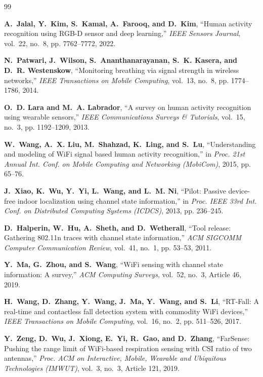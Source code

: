 \newpage
\renewcommand{\bibname}{References}

\begin{thebibliography}{99}

{\bfseries A.~Jalal, Y.~Kim, S.~Kamal, A.~Farooq, and D.~Kim}, ``Human activity recognition using RGB-D sensor and deep learning,'' {\em IEEE Sensors Journal}, vol.~22, no.~8, pp. 7762--7772, 2022.

{\bfseries N.~Patwari, J.~Wilson, S.~Ananthanarayanan, S.~K. Kasera, and D.~R. Westenskow}, ``Monitoring breathing via signal strength in wireless networks,'' {\em IEEE Transactions on Mobile Computing}, vol.~13, no.~8, pp. 1774--1786, 2014.

{\bfseries O.~D. Lara and M.~A. Labrador}, ``A survey on human activity recognition using wearable sensors,'' {\em IEEE Communications Surveys \& Tutorials}, vol.~15, no.~3, pp. 1192--1209, 2013.

{\bfseries W.~Wang, A.~X. Liu, M.~Shahzad, K.~Ling, and S.~Lu}, ``Understanding and modeling of WiFi signal based human activity recognition,'' in {\em Proc. 21st Annual Int. Conf. on Mobile Computing and Networking (MobiCom)}, 2015, pp. 65--76.

{\bfseries J.~Xiao, K.~Wu, Y.~Yi, L.~Wang, and L.~M. Ni}, ``Pilot: Passive device-free indoor localization using channel state information,'' in {\em Proc. IEEE 33rd Int. Conf. on Distributed Computing Systems (ICDCS)}, 2013, pp. 236--245.

{\bfseries D.~Halperin, W.~Hu, A.~Sheth, and D.~Wetherall}, ``Tool release: Gathering 802.11n traces with channel state information,'' {\em ACM SIGCOMM Computer Communication Review}, vol.~41, no.~1, pp. 53--53, 2011.

{\bfseries Y.~Ma, G.~Zhou, and S.~Wang}, ``WiFi sensing with channel state information: A survey,'' {\em ACM Computing Surveys}, vol.~52, no.~3, Article 46, 2019.

{\bfseries H.~Wang, D.~Zhang, Y.~Wang, J.~Ma, Y.~Wang, and S.~Li}, ``RT-Fall: A real-time and contactless fall detection system with commodity WiFi devices,'' {\em IEEE Transactions on Mobile Computing}, vol.~16, no.~2, pp. 511--526, 2017.

{\bfseries Y.~Zeng, D.~Wu, J.~Xiong, E.~Yi, R.~Gao, and D.~Zhang}, ``FarSense: Pushing the range limit of WiFi-based respiration sensing with CSI ratio of two antennas,'' {\em Proc. ACM on Interactive, Mobile, Wearable and Ubiquitous Technologies (IMWUT)}, vol.~3, no.~3, Article 121, 2019.


\end{thebibliography}
